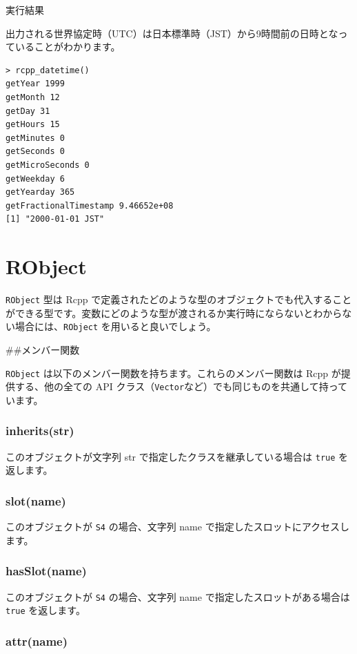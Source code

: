 \documentclass[]{book}
\begin{document}
実行結果

出力される世界協定時（UTC）は日本標準時（JST）から9時間前の日時となっていることがわかります。

\begin{verbatim}
> rcpp_datetime()
getYear 1999
getMonth 12
getDay 31
getHours 15
getMinutes 0
getSeconds 0
getMicroSeconds 0
getWeekday 6
getYearday 365
getFractionalTimestamp 9.46652e+08
[1] "2000-01-01 JST"
\end{verbatim}

\hypertarget{robject}{%
\chapter{RObject}\label{robject}}

\texttt{RObject} 型は Rcpp で定義されたどのような型のオブジェクトでも代入することができる型です。変数にどのような型が渡されるか実行時にならないとわからない場合には、\texttt{RObject} を用いると良いでしょう。

\#\#メンバー関数

\texttt{RObject} は以下のメンバー関数を持ちます。これらのメンバー関数は Rcpp が提供する、他の全ての API クラス（\texttt{Vector}など）でも同じものを共通して持っています。

\hypertarget{inheritsstr-1}{%
\subsection{inherits(str)}\label{inheritsstr-1}}

このオブジェクトが文字列 str で指定したクラスを継承している場合は \texttt{true} を返します。

\hypertarget{slotname}{%
\subsection{slot(name)}\label{slotname}}

このオブジェクトが \texttt{S4} の場合、文字列 name で指定したスロットにアクセスします。

\hypertarget{hasslotname}{%
\subsection{hasSlot(name)}\label{hasslotname}}

このオブジェクトが \texttt{S4} の場合、文字列 name で指定したスロットがある場合は \texttt{true} を返します。

\hypertarget{attrname}{%
\subsection{attr(name)}\label{attrname}}
\end{document}
